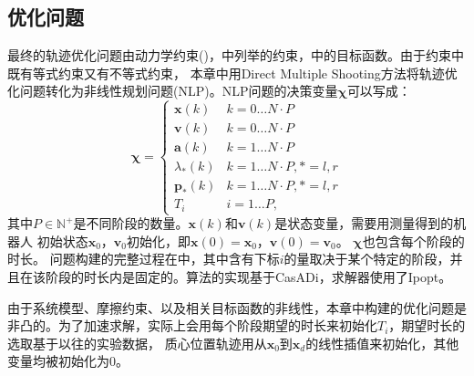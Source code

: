 \subsection{优化问题}
最终的轨迹优化问题由动力学约束()，中列举的约束，中的目标函数。由于约束中既有等式约束又有不等式约束，
本章中用Direct Multiple Shooting方法\cite{betts2010practical}将轨迹优化问题转化为非线性规划问题(NLP)。NLP问题的决策变量$\boldsymbol{\chi}$可以写成：
\begin{equation}
    \label{equ:decision_variable}
    \boldsymbol{\chi} = \begin{cases}\boldsymbol{x}(k) & k=0 \ldots N \cdot P \\ \boldsymbol{v}(k) & k=0 \ldots N \cdot P \\ \boldsymbol{a}(k) & k=1 \ldots N \cdot P \\ \lambda_*(k) & k=1 \ldots N \cdot P, *=l, r \\ \boldsymbol{p}_*(k) & k=1 \ldots N \cdot P, *=l, r \\ T_i & i=1 \ldots P,\end{cases}
\end{equation}
其中$P \in \mathbb{N}^+$是不同阶段的数量。$\boldsymbol{x}(k)$和$\boldsymbol{v}(k)$是状态变量，需要用测量得到的机器人
初始状态$\boldsymbol{x}_0$，$\boldsymbol{v}_0$初始化，即$\boldsymbol{x}(0)=\boldsymbol{x}_0$，$\boldsymbol{v}(0)=\boldsymbol{v}_0$。
$\boldsymbol{\chi}$也包含每个阶段的时长。
问题构建的完整过程在中，其中含有下标$i$的量取决于某个特定的阶段，并且在该阶段的时长内是固定的。算法的实现基于CasADi，求解器使用了Ipopt。

由于系统模型、摩擦约束、以及相关目标函数的非线性，本章中构建的优化问题是非凸的。为了加速求解，实际上会用每个阶段期望的时长来初始化$T_i$，期望时长的选取基于以往的实验数据，
质心位置轨迹用从$\boldsymbol{x}_0$到$\boldsymbol{x}_d$的线性插值来初始化，其他变量均被初始化为0。
